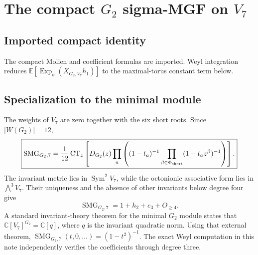 \documentclass[10pt]{article}
\newcommand{\CT}{\operatorname{CT}}
\newcommand{\ExpS}{\operatorname{Exp}_{\sigma}}
\newcommand{\SMG}{\operatorname{SMG}}
\newcommand{\smgv}[2]{\mathbb E\!\left[\ExpS\!\left(X_{#1,#2}h_1\right)\right]}
\begin{document}
\section[The compact G2 sigma-MGF on V7]{The compact $G_2$ sigma-MGF on $V_7$}\label{proof:g2}
\begingroup
{}
\providecommand{\Sg}{\SMG}
\renewcommand{\Sg}{\SMG}
\providecommand{\CT}{\operatorname{CT}}
\renewcommand{\CT}{\operatorname{CT}}
\setcounter{theorem}{0}
\setcounter{proposition}{0}
\setcounter{lemma}{0}
\setcounter{corollary}{0}
\setcounter{remark}{0}
\begin{abstract}
We prove the compact Molien--Weyl formula for the minimal seven-dimensional
$G_2$-module, construct its maximal-torus matrices from the weights, and
verify every Schur coefficient through degree three exactly.  The result is
$\Sg_{G_2,7}=1+h_2+e_3+O_{\ge4}$, and the ordinary specialization is
$(1-t^2)^{-1}$.
\end{abstract}

\subsection{Imported compact identity}
The compact Molien and coefficient formulas are imported. Weyl integration
reduces $\smgv{G_2}{V_7}$ to the maximal-torus constant term below.

\subsection{Specialization to the minimal module}
The weights of $V_7$ are zero together with the six short roots.  Since
$|W(G_2)|=12$,
\[
 \boxed{\Sg_{G_2,7}=\frac1{12}\CT_z\left[D_{G_2}(z)
 \prod_a\left((1-t_a)^{-1}\prod_{\beta\in\Phi_{\rm short}}
 (1-t_a z^\beta)^{-1}\right)\right].}
\]
The invariant metric lies in $\operatorname{Sym}^2V_7$, while the octonionic
associative form lies in $\bigwedge^3V_7$.  Their uniqueness and the absence
of other invariants below degree four give
\[
 \boxed{\Sg_{G_2,7}=1+h_2+e_3+O_{\ge4}.}
\]
A standard invariant-theory theorem for the minimal $G_2$ module states that
$\mathbb C[V_7]^{G_2}=\mathbb C[q]$, where $q$ is the invariant quadratic
norm.  Using that external theorem,
$\Sg_{G_2,7}(t,0,\ldots)=(1-t^2)^{-1}$.  The exact Weyl computation in this
note independently verifies the coefficients through degree three.
\end{document}

